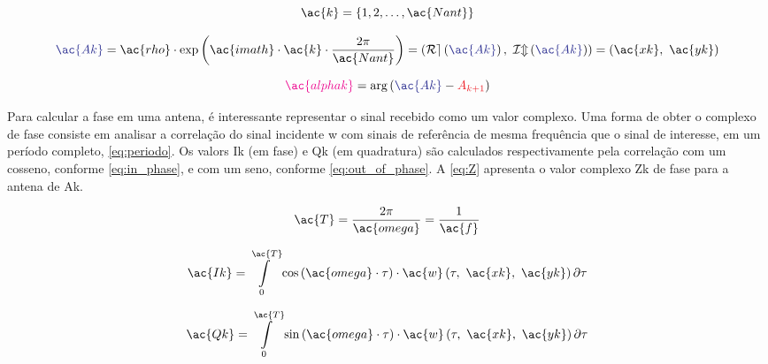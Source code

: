 \begin{equation} \label{eq:ant:idx} %
	\ac{k} = \left\{1, 2, \dotsc, \ac{Nant}\right\}
\end{equation}

\begin{equation} \label{eq:ant:coord}
	\textcolor{cmyk_B}{\ac{Ak}} =
    \ac{rho}
    \cdot \exp\left(\ac{imath}\cdot \ac{k} \cdot \frac{2\pi}{\ac{Nant}}\right) =
    \left( \operatorname{\mathcal{Re}}\left( \textcolor{cmyk_B}{\ac{Ak}} \right), ~\operatorname{\mathcal{Im}}\left( \textcolor{cmyk_B}{\ac{Ak}} \right) \right) =
    \left( \ac{xk}, ~ \ac{yk} \right)
\end{equation}

\begin{equation} \label{eq:ant:angle}
	\textcolor{cmyk_M}{\ac{alphak}} = \arg\left( \textcolor{cmyk_B}{\ac{Ak}} - \textcolor{cmyk_R}{A_{k+1}} \right)
\end{equation}


Para calcular a fase em uma antena, é interessante representar o sinal recebido como um valor complexo.
Uma forma de obter o complexo de fase consiste em analisar a correlação do sinal incidente \ac{w} com sinais de referência de mesma frequência que o sinal de interesse, em um período completo, \autoref{eq:periodo}.
Os valors \ac{Ik} (em fase) e \ac{Qk} (em quadratura) são calculados respectivamente pela correlação com um cosseno, conforme \autoref{eq:in_phase}, e com um seno, conforme \autoref{eq:out_of_phase}.
A \autoref{eq:Z} apresenta o valor complexo \textcolor{cmyk_B}{\ac{Zk}} de fase para a antena de \textcolor{cmyk_B}{\ac{Ak}}.


\begin{equation} \label{eq:periodo}
    \ac{T} = \frac{2\pi}{\ac{omega}} = \frac{1}{\ac{f}}
\end{equation}

\begin{equation} \label{eq:in_phase}
    \ac{Ik} =
    \int\limits_0^{\ac{T}} \cos\left(\ac{omega} \cdot\tau\right)
    \cdot \ac{w}\left( \tau, ~\ac{xk}, ~\ac{yk} \right) \partial \tau
\end{equation}

\begin{equation} \label{eq:out_of_phase}
    \ac{Qk} =
    \int\limits_0^{\ac{T}} \sin\left(\ac{omega}\cdot\tau\right)
    \cdot \ac{w}\left( \tau, ~\ac{xk}, ~\ac{yk} \right) \partial \tau
\end{equation}

